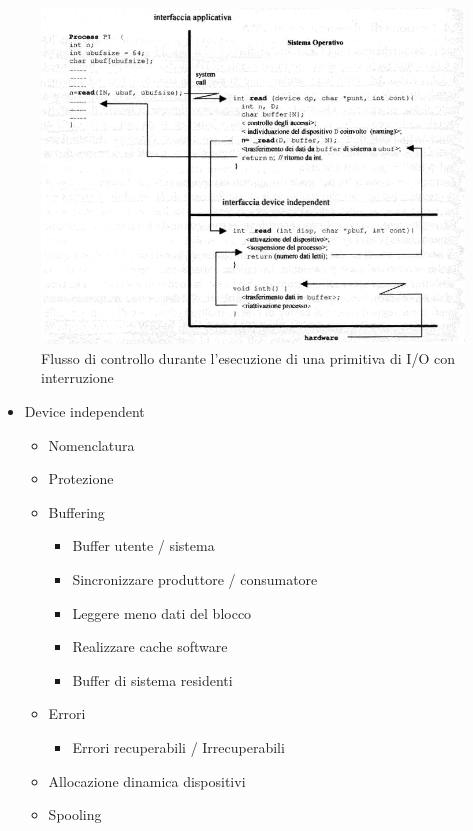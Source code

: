 \documentclass[12pt,a4paper]{article}
\begin{document}
\begin{figure}[H]
\centering
\includegraphics[width=18cm]{img/io/io-int.png}
\caption{Flusso di controllo durante l'esecuzione di una primitiva di I/O con interruzione}
\end{figure}

\begin{itemize}
\item Device independent
  \begin{itemize}
    \item Nomenclatura
    \item Protezione
    \item Buffering
    \begin{itemize}
      \item Buffer utente / sistema
      \item Sincronizzare produttore / consumatore
      \item Leggere meno dati del blocco
      \item Realizzare cache software
      \item Buffer di sistema residenti
    \end{itemize}
    \item Errori
    \begin{itemize}
      \item Errori recuperabili / Irrecuperabili
    \end{itemize}
    \item Allocazione dinamica dispositivi
    \item Spooling
  \end{itemize}
\end{itemize}
\end{document}
